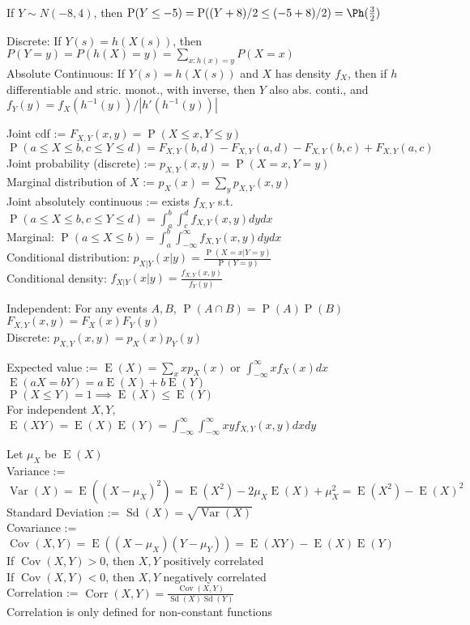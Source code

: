 \documentclass[12pt]{LatexTemplate/hw}
\renewcommand{\Pr}{\operatorname{P}}
\newcommand{\E}{\operatorname{E}}
\newcommand{\Var}{\operatorname{Var}}
\newcommand{\Sd}{\operatorname{Sd}}
\newcommand{\Cov}{\operatorname{Cov}}
\newcommand{\Corr}{\operatorname{Corr}}
\begin{document}
If $Y\sim N(-8,4)$, then $\Pr(Y\le -5)=\Pr((Y+8)/2\le (-5+8)/2)=\Ph(\frac{3}{2})$

Discrete: If $Y(s)=h(X(s))$, then $P(Y=y)=P(h(X)=y)=\sum_{x:h(x)=y} P(X=x)$\\
Absolute Continuous: If $Y(s)=h(X(s))$ and $X$ has density $f_X$, then if $h$ differentiable and stric. monot., with inverse, then $Y$ also abs. conti., and $f_Y(y)=f_X(h^{-1}(y)) / |h'(h^{-1}(y))|$

Joint cdf := $F_{X,Y}(x,y)=\Pr(X\le x, Y\le y)$\\
$\Pr(a\le X\le b, c\le Y\le d)=F_{X,Y}(b,d)-F_{X,Y}(a,d)-F_{X,Y}(b,c)+F_{X,Y}(a,c)$\\
Joint probability (discrete) := $p_{X,Y}(x,y)=\Pr(X=x, Y=y)$\\
Marginal distribution of $X$ := $p_X(x)=\sum_y p_{X,Y}(x,y)$\\
Joint absolutely continuous := exists $f_{X,Y}$ s.t. $\Pr(a\le X\le b, c\le Y\le d)=\int_a^b\int_c^d f_{X,Y}(x,y)dydx$\\
Marginal: $\Pr(a\le X\le b)=\int_a^b\int_{-\infty}^\infty f_{X,Y}(x,y)dydx$\\
Conditional distribution: $p_{X|Y}(x|y)=\frac{\Pr(X=x|Y=y)}{\Pr(Y=y)}$\\
Conditional density: $f_{X|Y}(x|y)=\frac{f_{X,Y}(x,y)}{f_Y(y)}$

Independent: For any events $A,B$, $\Pr(A\cap B)=\Pr(A)\Pr(B)$\\
$F_{X,Y}(x,y)=F_X(x)F_Y(y)$\\
Discrete: $p_{X,Y}(x,y)=p_X(x)p_Y(y)$

Expected value := $\E(X)=\sum_x xp_X(x)$ or $\int_{-\infty}^\infty xf_X(x)dx$\\
$\E(aX=bY)=a\E(X)+b\E(Y)$\\
$\Pr(X\le Y)=1\implies \E(X)\le \E(Y)$\\
For independent $X,Y$, $\E(XY)=\E(X)\E(Y)=\int_{-\infty}^\infty\int_{-\infty}^\infty xyf_{X,Y}(x,y)dxdy$




Let $\mu_X$ be $\E(X)$\\
Variance := $\Var(X)=\E((X-\mu_X)^2)=\E(X^2)-2\mu_X\E(X)+\mu_X^2=\E(X^2)-\E(X)^2$\\
Standard Deviation := $\Sd(X)=\sqrt{\Var(X)}$\\

Covariance := $\Cov(X,Y)=\E((X-\mu_X)(Y-\mu_Y))=\E(XY)-\E(X)\E(Y)$\\
If $\Cov(X,Y)>0$, then $X,Y$ positively correlated\\
If $\Cov(X,Y)<0$, then $X,Y$ negatively correlated\\
Correlation := $\Corr(X,Y)=\frac{\Cov(X,Y)}{\Sd(X)\Sd(Y)}$\\
Correlation is only defined for non-constant functions
\end{document}

